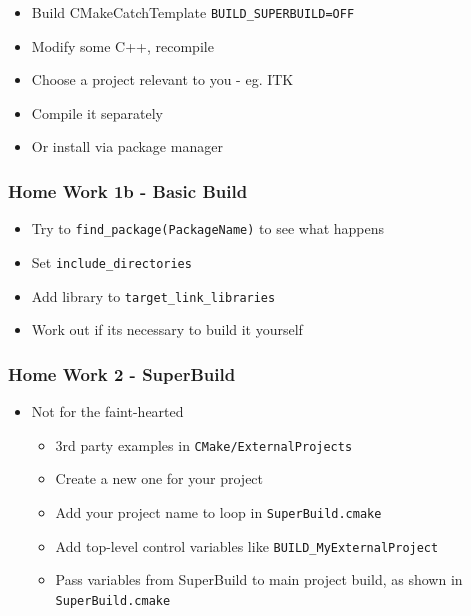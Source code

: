 \begin{itemize}
\itemsep1pt\parskip0pt
\item
  Build CMakeCatchTemplate \texttt{BUILD\_SUPERBUILD=OFF}
\item
  Modify some C++, recompile
\item
  Choose a project relevant to you - eg. ITK
\item
  Compile it separately
\item
  Or install via package manager
\end{itemize}

\subsubsection{Home Work 1b - Basic
Build}\label{home-work-1b---basic-build}

\begin{itemize}
\itemsep1pt\parskip0pt
\item
  Try to \texttt{find\_package(PackageName)} to see what happens
\item
  Set \texttt{include\_directories}
\item
  Add library to \texttt{target\_link\_libraries}
\item
  Work out if its necessary to build it yourself
\end{itemize}

\subsubsection{Home Work 2 - SuperBuild}\label{home-work-2---superbuild}

\begin{itemize}
\itemsep1pt\parskip0pt
\item
  Not for the faint-hearted

  \begin{itemize}
  \itemsep1pt\parskip0pt
  \item
    3rd party examples in \texttt{CMake/ExternalProjects}
  \item
    Create a new one for your project
  \item
    Add your project name to loop in \texttt{SuperBuild.cmake}
  \item
    Add top-level control variables like
    \texttt{BUILD\_MyExternalProject}
  \item
    Pass variables from SuperBuild to main project build, as shown in
    \texttt{SuperBuild.cmake}
  \end{itemize}
\end{itemize}

